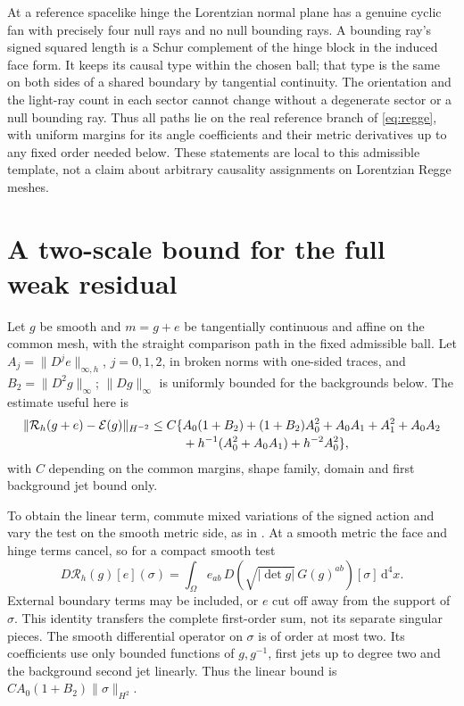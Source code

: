 \documentclass[11pt]{article}
\newcommand{\dd}{\mathrm d}
\newcommand{\Rcal}{\mathcal R}
\newcommand{\Ecal}{\mathcal E}
\begin{document}
At a reference spacelike hinge the Lorentzian normal plane
has a genuine cyclic fan with precisely four null rays and
no null bounding rays. A bounding ray's signed squared
length is a Schur complement of the hinge block in the
induced face form. It keeps its causal type within the
chosen ball; that type is the same on both sides of a
shared boundary by tangential continuity. The orientation
and the light-ray count in each sector cannot change without
a degenerate sector or a null bounding ray. Thus all paths
lie on the real reference branch of \eqref{eq:regge}, with
uniform margins for its angle coefficients and their metric
derivatives up to any fixed order needed below. These statements
are local to this admissible template, not a claim about
arbitrary causality assignments on Lorentzian Regge meshes.

\section{A two-scale bound for the full weak residual}\label{sec:bounds}

Let \(g\) be smooth and \(m=g+e\) be tangentially continuous and
affine on the common mesh, with the straight comparison path
in the fixed admissible ball. Let \(A_j=\|D^j e\|_{\infty,h}\),
\(j=0,1,2\), in broken norms with one-sided traces, and
\(B_2=\|D^2g\|_\infty\); \(\|Dg\|_\infty\) is uniformly bounded
for the backgrounds below. The estimate useful here is
\begin{align}
 \|\Rcal_h(g+e)-\Ecal(g)\|_{H^{-2}}\le C\{&
 A_0(1+B_2)+(1+B_2)A_0^2+A_0A_1+A_1^2+A_0A_2
 \notag\\[-2pt]
 &+h^{-1}(A_0^2+A_0A_1)+h^{-2}A_0^2\},
 \label{eq:uniform}
\end{align}
with \(C\) depending on the common margins, shape family,
domain and first background jet bound only.

To obtain the linear term, commute mixed variations of the
signed action and vary the test on the smooth metric side,
as in \cite{SignedRegge}. At a smooth metric the face and hinge
terms cancel, so for a compact smooth test
\begin{equation}
 D\Rcal_h(g)[e](\sigma)
   =\int_\Omega e_{ab}\,
        D\!\left(\sqrt{|\det g|}\,G(g)^{ab}\right)[\sigma]\,\dd^4x .
 \label{eq:hess}
\end{equation}
External boundary terms may be included, or \(e\) cut off away
from the support of \(\sigma\). This identity transfers
the complete first-order sum, not its separate singular
pieces. The smooth differential operator on \(\sigma\) is
of order at most two. Its coefficients use only bounded
functions of \(g,g^{-1}\), first jets up to degree two
and the background second jet linearly. Thus the linear
bound is \(CA_0(1+B_2)\|\sigma\|_{H^2}\).
\end{document}
